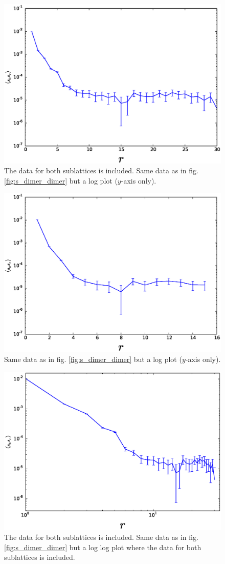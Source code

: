 \documentclass[aps,floatfix,11pt]{revtex4-1}
\begin{document}
\begin{figure}[h]
    \centering
    \includegraphics[width=8.5 cm]{s_dimer_dimer_cor_log_both_sublat}
    \caption{The data for both sublattices is included. Same data as in fig. \ref{fig:s_dimer_dimer} but a log plot ($y$-axis only).
    \label{fig:s_dimer_dimer_log}}
\end{figure}

\begin{figure}[h]
    \centering
    \includegraphics[width=8.5 cm]{s_dimer_dimer_cor_log}
    \caption{Same data as in fig. \ref{fig:s_dimer_dimer} but a log plot ($y$-axis only).
    \label{fig:s_dimer_dimer_log}}
\end{figure}


\begin{figure}[h]
    \centering
    \includegraphics[width=8.5 cm]{s_dimer_dimer_cor_loglog_both_sublat}
    \caption{The data for both sublattices is included. Same data as in fig. \ref{fig:s_dimer_dimer} but a log log plot where the data for both
        sublattices is included.
    \label{fig:s_dimer_dimer_loglog}}
\end{figure}
\end{document}
